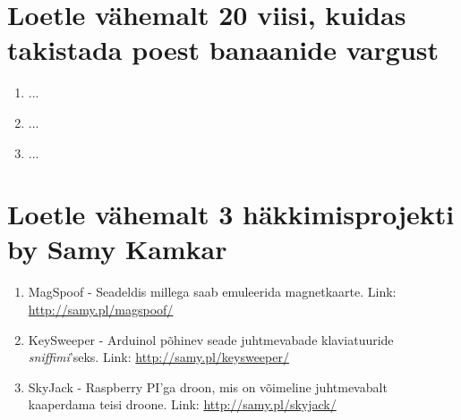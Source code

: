 \documentclass{article}
\begin{document}
\section{Loetle vähemalt 20 viisi, kuidas takistada poest banaanide vargust}
\begin{enumerate}
	\item{...}
	\item{...}
	\item{...}
\end{enumerate}

\section{Loetle vähemalt 3 häkkimisprojekti by Samy Kamkar}
\begin{enumerate}
	\item{MagSpoof - Seadeldis millega saab emuleerida magnetkaarte. Link: \url{http://samy.pl/magspoof/}}
	\item{KeySweeper - Arduinol põhinev seade juhtmevabade klaviatuuride \textit{sniffimi}'seks. Link: \url{http://samy.pl/keysweeper/}}
	\item{SkyJack - Raspberry PI'ga droon, mis on võimeline juhtmevabalt kaaperdama teisi droone. Link: \url{http://samy.pl/skyjack/}}
\end{enumerate}
\end{document}
